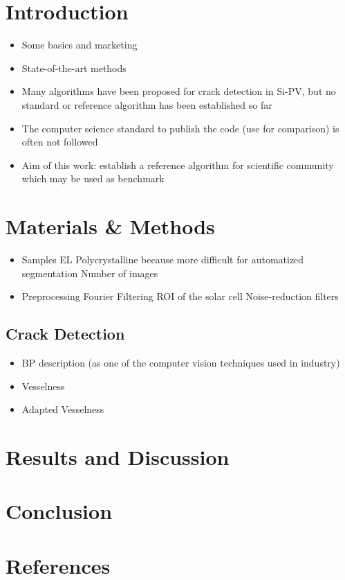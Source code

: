 \documentclass[conference]{IEEEtran}
\begin{document}
\section{Introduction}
\begin{itemize}
	\item Some basics and marketing
	\item  State-of-the-art methods
	\item Many algorithms have been proposed for crack detection in Si-PV, but no standard or reference algorithm has been established so far
	\item The computer science standard to publish the code (use for comparison) is often not followed  
	\item Aim of this work: establish a reference algorithm for scientific community which may be used as benchmark
\end{itemize}
 

\section{Materials \& Methods}
\begin{itemize}
	\item Samples 
	\subitem EL
	\subitem Polycrystalline because more difficult for automatized segmentation
	\subitem Number of images
	
	\item Preprocessing
	\subitem Fourier Filtering
	\subitem ROI of the solar cell
	\subitem Noise-reduction filters
\end{itemize}

\subsection{Crack Detection}
\begin{itemize}
	\item BP description (as one of the computer vision techniques used in industry)
	\item Vesselness
	\item  Adapted Vesselness
\end{itemize}

\section{Results and Discussion}



\section{Conclusion}


\section{References}
\end{document}
